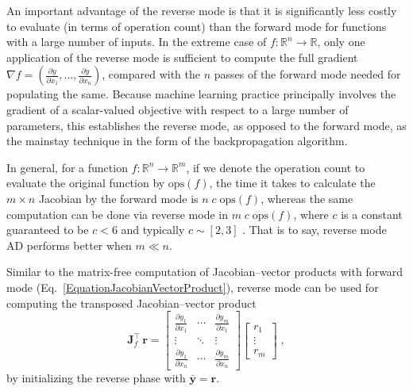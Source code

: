 \documentclass[twoside,11pt]{article}
\begin{document}
An important advantage of the reverse mode is that it is significantly less costly to evaluate (in terms of operation count) than the forward mode for functions with a large number of inputs. In the extreme case of $f: \mathbb{R}^n \to \mathbb{R}$, only one application of the reverse mode is sufficient to compute the full gradient $\nabla f = \left(\frac{\partial y}{\partial x_1},\dots,\frac{\partial y}{\partial x_n}\right)$, compared with the $n$ passes of the forward mode needed for populating the same. Because machine learning practice principally involves the gradient of a scalar-valued objective with respect to a large number of parameters, this establishes the reverse mode, as opposed to the forward mode, as the mainstay technique in the form of the backpropagation algorithm.

In general, for a function $f: \mathbb{R}^n \to \mathbb{R}^m$, if we denote the operation count to evaluate the original function by $\textrm{ops}(f)$, the time it takes to calculate the $m \times n$ Jacobian by the forward mode is $n\;c\;\textrm{ops}(f)$, whereas the same computation can be done via reverse mode in $m\;c\;\textrm{ops}(f)$, where $c$ is a constant guaranteed to be $c<6$ and typically $c \sim [2,3]$ \citep{Griewank2008}. That is to say, reverse mode AD performs better when $m \ll n$.

Similar to the matrix-free computation of Jacobian--vector products with forward mode (Eq.~\ref{EquationJacobianVectorProduct}), reverse mode can be used for computing the transposed Jacobian--vector product
\begin{equation*}
  \mathbf{J}^{\intercal}_f\,\mathbf{r} = \begin{bmatrix}
                    \frac{\partial y_1}{\partial x_1} & \cdots & \frac{\partial y_m}{\partial x_1} \\
                    \vdots & \ddots & \vdots \\
                    \frac{\partial y_1}{\partial x_n} & \cdots & \frac{\partial y_m}{\partial x_n}
                   \end{bmatrix}
                   \begin{bmatrix}
                    r_1 \\
                    \vdots \\
                    r_m
                   \end{bmatrix}\;,
\end{equation*}
by initializing the reverse phase with $\bar{\mathbf{y}}=\mathbf{r}$.
\end{document}

